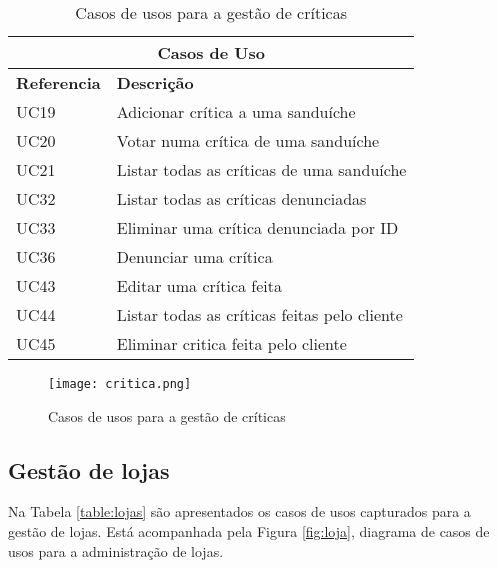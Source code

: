\begin{table}[H]
\caption{Casos de usos para a gestão de críticas}
\label{table:criticas}
\begin{center}
\begin{tabular}{ |p{2cm}|p{10cm}|  }
\hline
\multicolumn{2}{|c|}{Casos de Uso} \\
\hline
\textbf{Referencia} & \textbf{Descrição} \\
\hline
UC19 & Adicionar crítica a uma sanduíche\\
\hline
UC20 & Votar numa crítica de uma sanduíche\\
\hline
UC21 & Listar todas as críticas de uma sanduíche\\
\hline
UC32 & Listar todas as críticas denunciadas\\
\hline
UC33 & Eliminar uma crítica denunciada por ID\\
\hline
UC36 & Denunciar uma crítica\\
\hline
UC43 & Editar uma crítica feita\\
\hline
UC44 & Listar todas as críticas feitas pelo cliente\\
\hline
UC45 & Eliminar critica feita pelo cliente\\

\hline
\end{tabular} 
\end{center}
\end{table}


\begin{figure}[H]
    \centering
    \texttt{[image: critica.png]}
    \caption{Casos de usos para a gestão de críticas}
    \label{fig:criticas}
\end{figure}
\newpage

\subsection{Gestão de lojas}

Na Tabela \ref{table:lojas} são apresentados os casos de usos capturados para a gestão de lojas. Está acompanhada pela Figura \ref{fig:loja}, diagrama de casos de usos para a administração de lojas.


